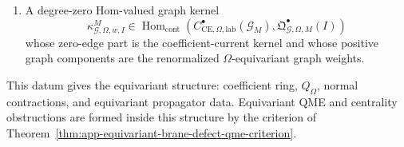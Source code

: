 \begin{defn}
\begin{enumerate}[label={(\(\Omega\arabic*\))}]
    \item A degree-zero Hom-valued graph kernel
      \[
        \kappa^M_{\mathcal G,\Omega,w,I}
        \in
        \operatorname{Hom}_{\mathrm{cont}}
        \left(
          C^\bullet_{\mathrm{CE},\Omega,\mathrm{lab}}(\mathcal G_M),
          \mathfrak Q^\bullet_{\mathcal G,\Omega,M}(I)
        \right)
      \]
      whose zero-edge part is the coefficient-current kernel and whose
      positive graph components are the renormalized
      \(\Omega\)-equivariant graph weights.
  \end{enumerate}
  This datum gives the equivariant structure: coefficient ring,
  \(Q_\Omega\), normal contractions, and equivariant propagator data.
  Equivariant QME and centrality obstructions are formed inside this
  structure by the criterion of
  Theorem~\ref{thm:app-equivariant-brane-defect-qme-criterion}.
\end{defn}

